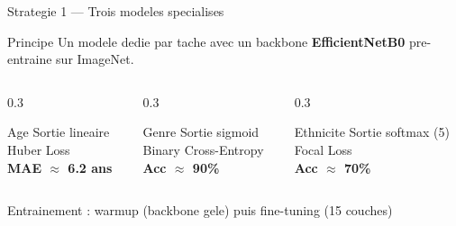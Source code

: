 \documentclass[aspectratio=169, 12pt]{beamer}
\begin{document}
\begin{frame}{Strategie 1 --- Trois modeles specialises}

\begin{exampleblock}{Principe}
{\small Un modele dedie par tache avec un backbone \textbf{EfficientNetB0} pre-entraine sur ImageNet.}
\end{exampleblock}

\vspace{0.2cm}

\begin{columns}[T]
\begin{column}{0.3\textwidth}
\begin{block}{\centering Age}
\centering
{\small Sortie lineaire\\Huber Loss\\[0.1cm]\textbf{MAE $\approx$ 6.2 ans}}
\end{block}
\end{column}
\begin{column}{0.3\textwidth}
\begin{block}{\centering Genre}
\centering
{\small Sortie sigmoid\\Binary Cross-Entropy\\[0.1cm]\textbf{Acc $\approx$ 90\%}}
\end{block}
\end{column}
\begin{column}{0.3\textwidth}
\begin{block}{\centering Ethnicite}
\centering
{\small Sortie softmax (5)\\Focal Loss\\[0.1cm]\textbf{Acc $\approx$ 70\%}}
\end{block}
\end{column}
\end{columns}

\vspace{0.2cm}
\centering
{\small\color{steel} Entrainement : warmup (backbone gele) puis fine-tuning (15 couches)}
\end{frame}
\end{document}
